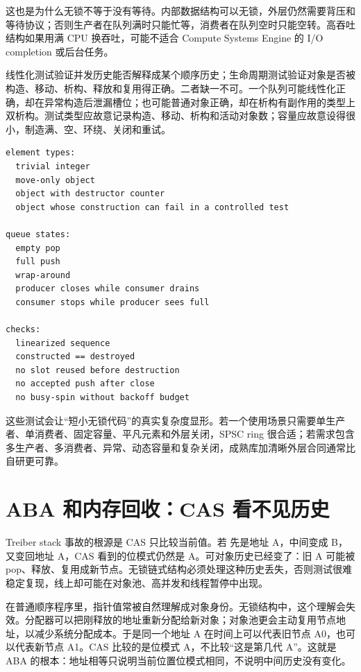 这也是为什么无锁不等于没有等待。内部数据结构可以无锁，外层仍然需要背压和等待协议；否则生产者在队列满时只能忙等，消费者在队列空时只能空转。高吞吐结构如果用满 CPU 换吞吐，可能不适合 Compute Systems Engine 的 I/O completion 或后台任务。

线性化测试验证并发历史能否解释成某个顺序历史；生命周期测试验证对象是否被构造、移动、析构、释放和复用得正确。二者缺一不可。一个队列可能线性化正确，却在异常构造后泄漏槽位；也可能普通对象正确，却在析构有副作用的类型上双析构。测试类型应故意记录构造、移动、析构和活动对象数；容量应故意设得很小，制造满、空、环绕、关闭和重试。

\begin{lstlisting}[numbers=none,caption={无锁生命周期测试矩阵}]
element types:
  trivial integer
  move-only object
  object with destructor counter
  object whose construction can fail in a controlled test

queue states:
  empty pop
  full push
  wrap-around
  producer closes while consumer drains
  consumer stops while producer sees full

checks:
  linearized sequence
  constructed == destroyed
  no slot reused before destruction
  no accepted push after close
  no busy-spin without backoff budget
\end{lstlisting}

这些测试会让“短小无锁代码”的真实复杂度显形。若一个使用场景只需要单生产者、单消费者、固定容量、平凡元素和外层关闭，SPSC ring 很合适；若需求包含多生产者、多消费者、异常、动态容量和复杂关闭，成熟库加清晰外层合同通常比自研更可靠。

\section{ABA 和内存回收：CAS 看不见历史}

Treiber stack 事故的根源是 CAS 只比较当前值。若  先是地址 A，中间变成 B，又变回地址 A，CAS 看到的位模式仍然是 A。可对象历史已经变了：旧 A 可能被 pop、释放、复用成新节点。无锁链式结构必须处理这种历史丢失，否则测试很难稳定复现，线上却可能在对象池、高并发和线程暂停中出现。

在普通顺序程序里，指针值常被自然理解成对象身份。无锁结构中，这个理解会失效。分配器可以把刚释放的地址重新分配给新对象；对象池更会主动复用节点地址，以减少系统分配成本。于是同一个地址 A 在时间上可以代表旧节点 A0，也可以代表新节点 A1。CAS 比较的是位模式 A，不比较“这是第几代 A”。这就是 ABA 的根本：地址相等只说明当前位置位模式相同，不说明中间历史没有变化。

